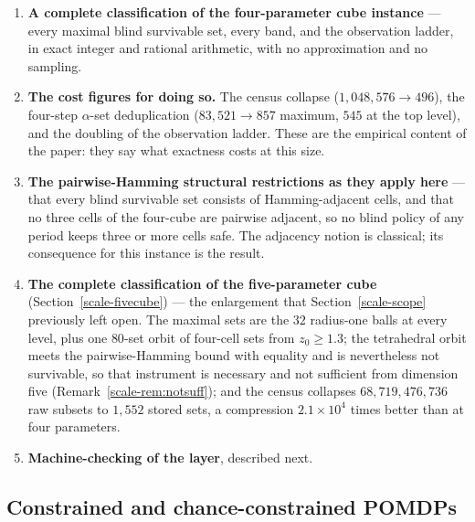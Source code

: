 \documentclass[10pt,twocolumn]{article}
\theoremstyle{plain}
\theoremstyle{definition}
\theoremstyle{remark}
\begin{document}
\begin{enumerate}
\item \textbf{A complete classification of the four-parameter cube instance} --- every
  maximal blind survivable set, every band, and the observation ladder, in exact integer
  and rational arithmetic, with no approximation and no sampling.
\item \textbf{The cost figures for doing so.} The census collapse
  (\(1{,}048{,}576 \to 496\)), the four-step \(\alpha\)-set deduplication
  (\(83{,}521 \to 857\) maximum, \(545\) at the top level), and the doubling of the observation ladder. These are the
  empirical content of the paper: they say what exactness costs at this size.
\item \textbf{The pairwise-Hamming structural restrictions as they apply here} --- that
  every blind survivable set consists of Hamming-adjacent cells, and that no three cells of
  the four-cube are pairwise adjacent, so no blind policy of any period keeps three or more
  cells safe. The adjacency notion is classical; its consequence for this instance is the
  result.
\item \textbf{The complete classification of the five-parameter cube}
  (Section~\ref{scale-fivecube}) --- the enlargement that Section~\ref{scale-scope} previously left open. The
  maximal sets are the \(32\) radius-one balls at every level, plus one \(80\)-set orbit of
  four-cell sets from \(z_{0} \ge 1.3\); the tetrahedral orbit meets the pairwise-Hamming bound
  with equality and is nevertheless not survivable, so that instrument is necessary and not
  sufficient from dimension five (Remark~\ref{scale-rem:notsuff}); and the census collapses
  \(68{,}719{,}476{,}736\) raw subsets to \(1{,}552\) stored sets, a compression
  \(2.1 \times 10^{4}\) times better than at four parameters.
\item \textbf{Machine-checking of the layer}, described next.
\end{enumerate}

\subsection{Constrained and chance-constrained POMDPs}
\label{scale-cpomdp}
\end{document}
